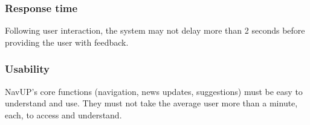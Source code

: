 \documentclass[12pt, a4paper]{article}
\begin{document}
		\subsubsection{Response time} Following user interaction, the system may not delay more than 2 seconds before providing the user with feedback.
		\subsubsection{Usability} NavUP's core functions (navigation, news updates, suggestions) must be easy to understand and use. They must not take the average user more than a minute, each, to access and understand. 
\end{document}
